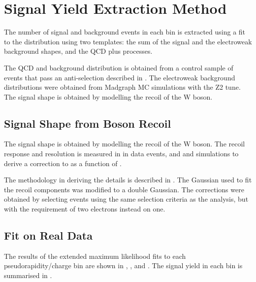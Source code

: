 \section{Signal Yield Extraction Method}
The number of signal and background events in each bin is extracted using a fit
to the \ETm distribution using two templates: the sum of the \Wenu signal and
the {electroweak} background shapes, and the {QCD} plus \gjet processes.

The {QCD} and \gjet background distribution is obtained from a control sample of
events that pass an anti-selection described in .
The {electroweak} background \ETm distributions were obtained from Madgraph {MC}
simulations with the Z2 tune.
The signal \ETm shape is obtained by modelling the recoil of the W boson. 

\subsection{Signal \ETm Shape from Boson Recoil}
The signal \ETm shape is obtained by modelling the recoil of the W boson.  The
recoil response and resolution is measured in in \HepProcess{\PZ\to\Pe\Pe} data
events, and \PW and  simulations to derive a correction to \ETm as a
function of \PW \pT \cite{bauer2010modeling,alcaraz2010updated}.

The methodology in deriving the details is described in .
The Gaussian used to fit the recoil components was modified to a double
Gaussian. 
The corrections were obtained by selecting \HepProcess{\PZ\to\Pe\Pe} events
using the same selection criteria as the analysis, but with the requirement of
two electrons instead on one.

\subsection{Fit on Real Data}
The results of the extended maximum likelihood fits to each pseudorapidity/charge
bin are shown in , ,  and
.
The signal yield in each bin is summarised in  .

